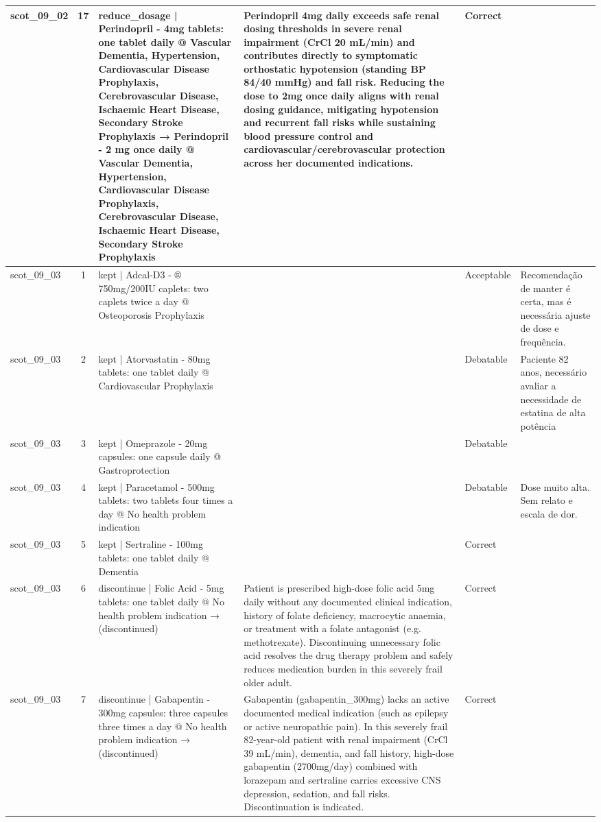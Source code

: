 \begin{longtable}{|p{1.45cm}|c|p{3.3cm}|p{6.5cm}|p{1.55cm}|p{2.3cm}|}
scot\_09\_02 & 17 & reduce\_dosage | Perindopril - 4mg tablets: one tablet daily @ Vascular Dementia, Hypertension, Cardiovascular Disease Prophylaxis, Cerebrovascular Disease, Ischaemic Heart Disease, Secondary Stroke Prophylaxis → Perindopril - 2 mg once daily @ Vascular Dementia, Hypertension, Cardiovascular Disease Prophylaxis, Cerebrovascular Disease, Ischaemic Heart Disease, Secondary Stroke Prophylaxis & Perindopril 4mg daily exceeds safe renal dosing thresholds in severe renal impairment (CrCl 20 mL/min) and contributes directly to symptomatic orthostatic hypotension (standing BP 84/40 mmHg) and fall risk. Reducing the dose to 2mg once daily aligns with renal dosing guidance, mitigating hypotension and recurrent fall risks while sustaining blood pressure control and cardiovascular/cerebrovascular protection across her documented indications. & Correct &  \\
\hline
scot\_09\_03 & 1 & kept | Adcal-D3 - ® 750mg/200IU caplets: two caplets twice a day @ Osteoporosis Prophylaxis &  & Acceptable & Recomendação de manter é certa, mas é necessária ajuste de dose e frequência. \\
\hline
scot\_09\_03 & 2 & kept | Atorvastatin - 80mg tablets: one tablet daily @ Cardiovascular Prophylaxis &  & Debatable & Paciente 82 anos, necessário avaliar a necessidade de estatina de alta potência \\
\hline
scot\_09\_03 & 3 & kept | Omeprazole - 20mg capsules: one capsule daily @ Gastroprotection &  & Debatable &  \\
\hline
scot\_09\_03 & 4 & kept | Paracetamol - 500mg tablets: two tablets four times a day @ No health problem indication &  & Debatable & Dose muito alta. Sem relato e escala de dor. \\
\hline
scot\_09\_03 & 5 & kept | Sertraline - 100mg tablets: one tablet daily @ Dementia &  & Correct &  \\
\hline
scot\_09\_03 & 6 & discontinue | Folic Acid - 5mg tablets: one tablet daily @ No health problem indication → (discontinued) & Patient is prescribed high-dose folic acid 5mg daily without any documented clinical indication, history of folate deficiency, macrocytic anaemia, or treatment with a folate antagonist (e.g. methotrexate). Discontinuing unnecessary folic acid resolves the drug therapy problem and safely reduces medication burden in this severely frail older adult. & Correct &  \\
\hline
scot\_09\_03 & 7 & discontinue | Gabapentin - 300mg capsules: three capsules three times a day @ No health problem indication → (discontinued) & Gabapentin (gabapentin\_300mg) lacks an active documented medical indication (such as epilepsy or active neuropathic pain). In this severely frail 82-year-old patient with renal impairment (CrCl 39 mL/min), dementia, and fall history, high-dose gabapentin (2700mg/day) combined with lorazepam and sertraline carries excessive CNS depression, sedation, and fall risks. Discontinuation is indicated. & Correct &  \\

\end{longtable}

